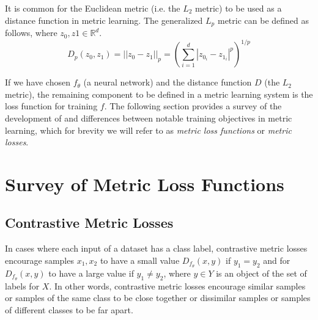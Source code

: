 \documentclass[./dissertation.tex]{subfiles}
\begin{document}
    It is common for the Euclidean metric (i.e. the $L_{2}$ metric) to be used as a distance function in metric learning. The generalized $L_p$ metric can be defined as follows, where $z_{0}, z{1} \in \mathbb{R}^{d}$.
          \begin{equation*}
            D_p(z_{0}, z_{1})= || z_{0} - z_{1} ||_{p} =
            (\sum_{i=1}^d | z_{0_{i}} - z_{1_{i}} |^{p})^{1/p} 
          \end{equation*}
    
    
    If we have chosen $f_{\theta}$ (a neural network) and the distance function $D$ (the $L_{2}$ metric), the remaining component to be defined in a metric learning system is the loss function for training $f$. The following section provides a survey of the development of and differences between notable training objectives in metric learning, which for brevity we will refer to as \textit{metric loss functions} or \textit{metric losses}.
    
    \section{Survey of Metric Loss Functions}
    
    \subsection{Contrastive Metric Losses}
    In cases where each input of a dataset has a class label, contrastive metric losses encourage samples $x_{1}, x_{2}$ to have a small value $D_{f_{\theta}}(x, y)$ if $y_1 = y_2$ and for  $D_{f_{\theta}}(x, y)$ to have a large value if $y_1 \neq y_2$, where $y \in Y$ is an object of the set of labels for $X$. In other words, contrastive metric losses encourage similar samples or samples of the same class to be close together or dissimilar samples or samples of different classes to be far apart. \\
    
\end{document}
